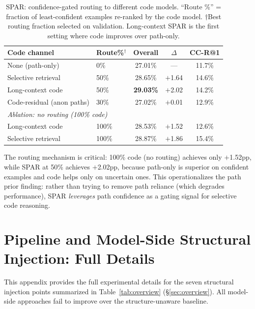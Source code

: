 \documentclass{article}
\begin{document}
\begin{table}[h]
\centering
\caption{SPAR: confidence-gated routing to different code models. ``Route \%'' = fraction of least-confident examples re-ranked by the code model. $\dagger$Best routing fraction selected on validation. Long-context SPAR is the first setting where code improves over path-only.}
\label{tab:spar}
\small
\begin{tabular}{llccc}
\toprule
\textbf{Code channel} & \textbf{Route\%}$^\dagger$ & \textbf{Overall} & \textbf{$\Delta$} & \textbf{CC-R@1} \\
\midrule
None (path-only) & 0\% & 27.01\% & --- & 11.7\% \\
\midrule
Selective retrieval & 50\% & 28.65\% & $+$1.64 & 14.6\% \\
Long-context code & 50\% & \textbf{29.03\%} & $+$2.02 & 14.2\% \\
Code-residual (anon paths) & 30\% & 27.02\% & $+$0.01 & 12.9\% \\
\midrule
\multicolumn{5}{l}{\emph{Ablation: no routing (100\% code)}} \\
Long-context code & 100\% & 28.53\% & $+$1.52 & 12.6\% \\
Selective retrieval & 100\% & 28.87\% & $+$1.86 & 15.4\% \\
\bottomrule
\end{tabular}
\end{table}

The routing mechanism is critical: 100\% code (no routing) achieves only $+$1.52pp, while SPAR at 50\% achieves $+$2.02pp, because path-only is superior on confident examples and code helps only on uncertain ones.
This operationalizes the path prior finding: rather than trying to remove path reliance (which degrades performance), SPAR \emph{leverages} path confidence as a gating signal for selective code reasoning.

\section{Pipeline and Model-Side Structural Injection: Full Details}
\label{app:model_side}
\label{app:pipeline_details}

This appendix provides the full experimental details for the seven structural injection points summarized in Table~\ref{tab:overview} (\S\ref{sec:overview}). All model-side approaches fail to improve over the structure-unaware baseline.
\end{document}
